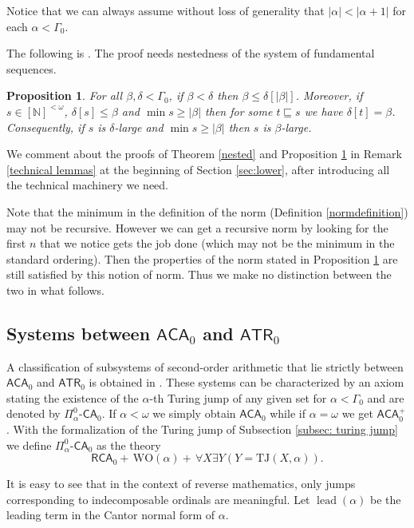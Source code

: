\documentclass[11pt]{amsart}
\newtheorem{proposition}[thm]{Proposition}
\theoremstyle{definition}
\theoremstyle{remark}
\theoremstyle{plain}
\newcommand{\numberset}{\mathbb}
\newcommand{\N}{\numberset{N}}
\def\a{\alpha}
\def\b{\beta}
\def\G{\Gamma}
\def\d{\delta}
\newcommand{\RCA}{\mathsf{RCA}_0}
\newcommand{\ACA}{\mathsf{ACA}_0}
\newcommand{\ATR}{\mathsf{ATR}_0}
\newcommand{\TJ}{\mathsf{TJ}}
\newcommand{\lead}{\operatorname{lead}}
\newcommand{\CA}{\mathsf{\text{-}CA}_0}
\def\TJ{{\textrm{TJ}}}
\def\WO{{\textrm{WO}}}
\def\N{{\mathbb{N}}}
\begin{document}
Notice that we can always assume without loss of generality that $|\a| < |\a + 1|$ for each $\a < \G_0$.

The following is \cite[Proposition 2.12]{marcone2025}.
The proof needs nestedness of the system of fundamental sequences.

\begin{proposition}\label{prop: goodnorm}
For all $\b, \d < \G_0$, if $\b < \d$ then $\b \le \d[|\b|]$.
Moreover, if $s \in [\N]^{<\omega}$, $\d[s] \le \b$ and $\min s \ge |\b|$ then for some $t \sqsubseteq s$ we have $\d[t] = \b$.
Consequently, if $s$ is $\d$-large and $\min s \ge |\b|$ then $s$ is $\b$-large.
\end{proposition}

We comment about the proofs of Theorem \ref{nested} and Proposition \ref{prop: goodnorm} in Remark \ref{technical lemmas} at the beginning of Section \ref{sec:lower}, after introducing all the technical machinery we need.

Note that the minimum in the definition of the norm (Definition \ref{normdefinition}) may not be recursive. However we can get a recursive norm by looking for the first $n$ that we notice gets the job done (which may not be the minimum in the standard ordering). Then the properties of the norm stated in Proposition \ref{prop: goodnorm} are still satisfied by this notion of norm. Thus we make no distinction between the two in what follows.

%
%

\subsection{Systems between $\ACA$ and $\ATR$}\label{ssec:systems}

%
%

A classification of subsystems of second-order arithmetic that lie strictly between $\ACA$ and $\ATR$ is obtained in \cite{marconemontalban}.
These systems can be characterized by an axiom stating the existence of the $\alpha$-th Turing jump of any given set for $\alpha < \G_0$ and are denoted by $\Pi^0_{\alpha} \CA$.
If $\alpha < \omega$ we simply obtain $\ACA$ while if $\alpha = \omega$ we get $\ACA^+$.
With the formalization of the Turing jump of Subsection \ref{subsec: turing jump} we define $\Pi^0_{\alpha} \CA$ as the theory
$$\RCA + \, \WO(\a) + \, \forall X \exists Y (Y = \TJ(X,\a)).$$

It is easy to see that in the context of reverse mathematics, only jumps corresponding to indecomposable ordinals are meaningful.
Let $\lead(\alpha)$ be the leading term in the Cantor normal form of $\alpha$.
\end{document}
